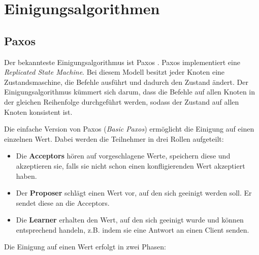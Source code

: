 \section{Einigungsalgorithmen}
\label{algos}

\subsection{Paxos}

Der bekannteste Einigungsalgorithmus ist Paxos \cite{paxos, paxos-made-simple}. Paxos implementiert eine \textit{Replicated State Machine}.  Bei diesem Modell besitzt jeder Knoten eine Zustandsmaschine, die Befehle ausführt und dadurch den Zustand ändert. Der Einigungsalgorithmus kümmert sich darum, dass die Befehle auf allen Knoten in der gleichen Reihenfolge durchgeführt werden, sodass der Zustand auf allen Knoten konsistent ist.

Die einfache Version von Paxos (\textit{Basic Paxos}) ermöglicht die Einigung auf einen einzelnen Wert. Dabei werden die Teilnehmer in drei Rollen aufgeteilt:
\begin{itemize}
	\item Die \textbf{Acceptors} hören auf vorgeschlagene Werte, speichern diese und akzeptieren sie, falls sie nicht schon einen konfligierenden Wert akzeptiert haben.
	\item Der \textbf{Proposer} schlägt einen Wert vor, auf den sich geeinigt werden soll. Er sendet diese an die Acceptors.
	\item Die \textbf{Learner} erhalten den Wert, auf den sich geeinigt wurde und können entsprechend handeln, z.B. indem sie eine Antwort an einen Client senden.
\end{itemize}

Die Einigung auf einen Wert erfolgt in zwei Phasen:

